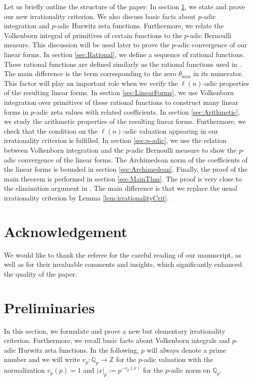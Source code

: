 \documentclass[12pt]{article}
\numberwithin{equation}{section}
\begin{document}
\bigskip

Let us briefly outline the structure of the paper: In section \ref{sec:Prelim}, we state and prove our new irrationality criterion. We also discuss basic facts about $p$-adic integration and $p$-adic Hurwitz zeta functions. Furthermore, we relate the Volkenborn integral of primitives of certain functions to the $p$-adic Bernoulli measure. This discussion will be used later to prove the $p$-adic convergence of our linear forms. In section \ref{sec:Rational}, we define a sequence of rational functions. These rational functions are defined similarly as the rational functions used in  \cite{LY2020}. The main difference is the term corresponding to the zero $\theta_{\mathrm{max}}$ in its numerator. This factor will play an important role when we verify the $\ell(n)$-adic properties of the resulting linear forms. In section \ref{sec:LinearForms}, we use Volkenborn integration over primitives of these rational functions to construct many linear forms in $p$-adic zeta values with related coefficients. In section \ref{sec:Arithmetic}, we study the arithmetic properties of the resulting linear forms. Furthermore, we check that the condition on the $\ell(n)$-adic valuation appearing in our irrationality criterion is fulfilled. In section \ref{sec:p-adic}, we use the relation between Volkenborn integration and  the $p$-adic Bernoulli measure to show the $p$-adic convergence of the linear forms. The Archimedean norm of the coefficients of the linear forms is bounded in section \ref{sec:Archimedean}. Finally, the proof of the main theorem is performed in section \ref{sec:MainThm}. The proof is very close to the elimination argument in \cite{FSZ2019,LY2020}. The main difference is that we replace the usual irrationality criterion by  Lemma \ref{lem:irrationalityCrit}.

\section*{Acknowledgement}
We would like to thank the referee for the careful reading of our manuscript, as well as for their invaluable comments and insights, which significantly enhanced the quality of the paper.

\section{Preliminaries}\label{sec:Prelim}

In this section, we formulate and prove a new but elementary irrationality criterion. Furthermore, we recall basic facts about Volkenborn integrals and $p$-adic Hurwitz zeta functions. In the following, $p$ will always denote a prime number and we will write $v_p\colon \mathbb{Q}_p\rightarrow \mathbb{Z}$ for the $p$-adic valuation with the normalization $v_p(p)=1$ and $|x|_p:=p^{-v_p(x)}$ for the $p$-adic norm on $\mathbb{Q}_p$.
\end{document}
